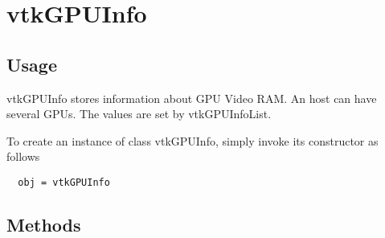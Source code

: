 \section{vtkGPUInfo}

\subsection{Usage}

 vtkGPUInfo stores information about GPU Video RAM. An host can have
 several GPUs. The values are set by vtkGPUInfoList.

To create an instance of class vtkGPUInfo, simply
invoke its constructor as follows
\begin{verbatim}
  obj = vtkGPUInfo
\end{verbatim}
\subsection{Methods}

